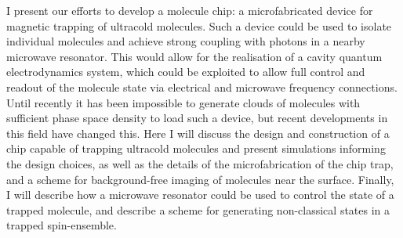 I present our efforts to develop a molecule chip: a microfabricated device for
magnetic trapping of ultracold molecules. Such a device could be used to
isolate individual molecules and achieve strong coupling with photons in a
nearby microwave resonator. This would allow for the realisation of a cavity
quantum electrodynamics system, which could be exploited to allow full control
and readout of the molecule state via electrical and microwave frequency
connections. Until recently it has been impossible to generate clouds of
molecules with sufficient phase space density to load such a device, but recent
developments in this field have changed this. Here I will discuss the design
and construction of a chip capable of trapping ultracold molecules and present
simulations informing the design choices, as well as the details of the
microfabrication of the chip trap, and a scheme for background-free imaging of
molecules near the surface.  Finally, I will describe how a microwave resonator
could be used to control the state of a trapped molecule, and describe a scheme
for generating non-classical states in a trapped spin-ensemble.
